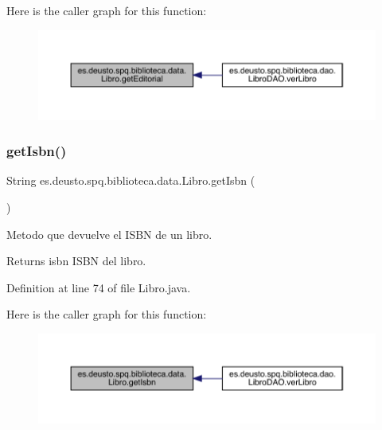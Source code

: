 Here is the caller graph for this function\+:
\nopagebreak
\begin{figure}[H]
\begin{center}
\leavevmode
\includegraphics[width=350pt]{classes_1_1deusto_1_1spq_1_1biblioteca_1_1data_1_1_libro_a246aede47ebda75d4ea896995573ab5b_icgraph}
\end{center}
\end{figure}
\mbox{\label{classes_1_1deusto_1_1spq_1_1biblioteca_1_1data_1_1_libro_a8cb61b4acf568ba35e27fbb13d20bc82}} 
\subsubsection{\texorpdfstring{get\+Isbn()}{getIsbn()}}
{\footnotesize\ttfamily String es.\+deusto.\+spq.\+biblioteca.\+data.\+Libro.\+get\+Isbn (\begin{DoxyParamCaption}{ }\end{DoxyParamCaption})}

Metodo que devuelve el I\+S\+BN de un libro. \begin{DoxyReturn}{Returns}
isbn I\+S\+BN del libro. 
\end{DoxyReturn}


Definition at line 74 of file Libro.\+java.

Here is the caller graph for this function\+:
\nopagebreak
\begin{figure}[H]
\begin{center}
\leavevmode
\includegraphics[width=350pt]{classes_1_1deusto_1_1spq_1_1biblioteca_1_1data_1_1_libro_a8cb61b4acf568ba35e27fbb13d20bc82_icgraph}
\end{center}
\end{figure}
\mbox{\label{classes_1_1deusto_1_1spq_1_1biblioteca_1_1data_1_1_libro_a9e03d89691d2549ee6702b801ad09e32}} 
